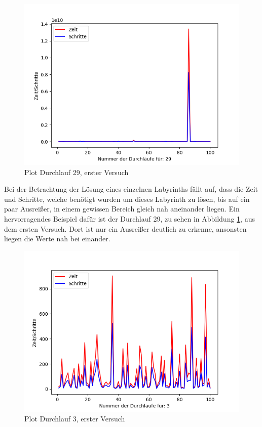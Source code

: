 \documentclass[12pt, a4paper, titlepage]{article}
\begin{document}
\begin{figure}[h]
\centering
\includegraphics[scale=.5]{29.png}
\caption{Plot Durchlauf 29, erster Versuch}
\label{fig:Plot 29}
\end{figure}

Bei der Betrachtung der Lösung eines einzelnen Labyrinths fällt auf, dass die Zeit und Schritte, welche benötigt wurden um dieses Labyrinth zu lösen, bis auf ein paar Ausreißer, in einem gewissen Bereich gleich nah aneinander liegen.
Ein hervorragendes Beispiel dafür ist der Durchlauf 29, zu sehen in Abbildung \ref{fig:Plot 29}, aus dem ersten Versuch.
Dort ist nur ein Ausreißer deutlich zu erkenne, ansonsten liegen die Werte nah bei einander.

\begin{figure}[h]
\centering
\includegraphics[scale=.5]{3.png}
\caption{Plot Durchlauf 3, erster Versuch}
\label{fig:Plot 3}
\end{figure}
\end{document}
